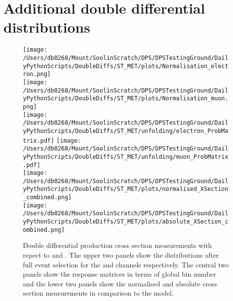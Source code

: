 \chapter{Additional double differential distributions} %
\label{ch:DD}
\begin{figure}[htpb]
	\centering
	\texttt{[image: /Users/db0268/Mount/SoolinScratch/DPS/DPSTestingGround/DailyPythonScripts/DoubleDiffs/ST\_MET/plots/Normalisation\_electron.png]} \\
	\texttt{[image: /Users/db0268/Mount/SoolinScratch/DPS/DPSTestingGround/DailyPythonScripts/DoubleDiffs/ST\_MET/plots/Normalisation\_muon.png]} \\
	\vspace{0.8cm}
	\texttt{[image: /Users/db0268/Mount/SoolinScratch/DPS/DPSTestingGround/DailyPythonScripts/DoubleDiffs/ST\_MET/unfolding/electron\_ProbMatrix.pdf]}
	\texttt{[image: /Users/db0268/Mount/SoolinScratch/DPS/DPSTestingGround/DailyPythonScripts/DoubleDiffs/ST\_MET/unfolding/muon\_ProbMatrix.pdf]} \\
	\vspace{0.8cm}
	\texttt{[image: /Users/db0268/Mount/SoolinScratch/DPS/DPSTestingGround/DailyPythonScripts/DoubleDiffs/ST\_MET/plots/normalised\_XSection\_combined.png]} \\
	\texttt{[image: /Users/db0268/Mount/SoolinScratch/DPS/DPSTestingGround/DailyPythonScripts/DoubleDiffs/ST\_MET/plots/absolute\_XSection\_combined.png]} \\
	\vspace{0.4cm}
	\caption[Double differential \ttbar{} production cross section measurements with repect to \ST{} and \ptmiss{}. The upper two panels show the distributions after full event selection for the \eJets{} and \muJets{} channels respectively. The central two panels show the response matrices in terms of global bin number and the lower two panels show the normalised and absolute cross section measurements in comparison to the \powhegpythia{} model.]{Double differential \ttbar{} production cross section measurements with repect to \ST{} and \ptmiss{}. The upper two panels show the distributions after full event selection for the \eJets{} and \muJets{} channels respectively. The central two panels show the response matrices in terms of global bin number and the lower two panels show the normalised and absolute cross section measurements in comparison to the \powhegpythia{} model.}
	\label{fig:ST_MET}
\end{figure}


